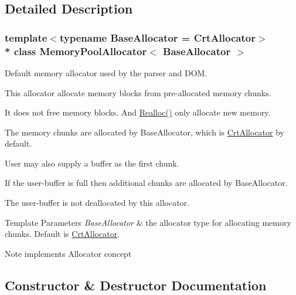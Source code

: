 \subsection{Detailed Description}
\subsubsection*{template$<$typename Base\+Allocator = Crt\+Allocator$>$\\*
class Memory\+Pool\+Allocator$<$ Base\+Allocator $>$}

Default memory allocator used by the parser and D\+OM. 

This allocator allocate memory blocks from pre-\/allocated memory chunks.

It does not free memory blocks. And \hyperlink{classMemoryPoolAllocator_aba75280d42184b0ad414243f7f5ac6c7}{Realloc()} only allocate new memory.

The memory chunks are allocated by Base\+Allocator, which is \hyperlink{classCrtAllocator}{Crt\+Allocator} by default.

User may also supply a buffer as the first chunk.

If the user-\/buffer is full then additional chunks are allocated by Base\+Allocator.

The user-\/buffer is not deallocated by this allocator.


\begin{DoxyTemplParams}{Template Parameters}
{\em Base\+Allocator} & the allocator type for allocating memory chunks. Default is \hyperlink{classCrtAllocator}{Crt\+Allocator}. \\
\hline
\end{DoxyTemplParams}
\begin{DoxyNote}{Note}
implements Allocator concept 
\end{DoxyNote}


\subsection{Constructor \& Destructor Documentation}
